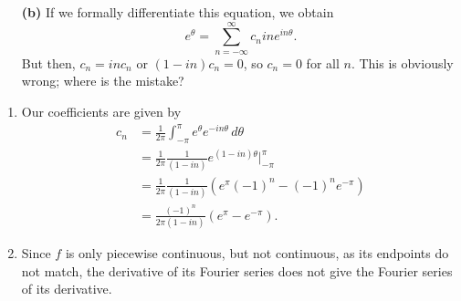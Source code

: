 \documentclass[10pt,letterpaper]{report}
\begin{document}
\begin{enumerate}
\begin{qbox}
\begin{itemize}
    \item[\textbf{(b)}] If we formally differentiate this equation, we obtain
    \[
    \displaystyle{e^\theta = \sum_{n = -\infty}^\infty c_nine^{in\theta}}.
    \]
    But then, $c_n = inc_n$ or $(1-in)c_n = 0$, so $c_n = 0$ for all $n$. This is obviously wrong; where is the mistake?
\end{itemize}
\end{qbox}

\begin{enumerate}
    \item Our coefficients are given by
    \begin{align*}
        c_n &= \frac{1}{2\pi} \int_{-\pi}^\pi e^\theta e^{-in\theta}\,d\theta
        \\
        &= \frac{1}{2\pi} \frac{1}{(1 - in)} e^{(1-in)\theta}\bigg\vert_{-\pi}^\pi
        \\
        &= \frac{1}{2\pi} \frac{1}{(1 - in)} \left(e^\pi(-1)^n - (-1)^ne^{-\pi}\right)
        \\
        &= \frac{(-1)^n}{2\pi(1 - in)} \left(e^\pi - e^{-\pi}\right).
    \end{align*}
    
    \item Since $f$ is only piecewise continuous, but not continuous, as its endpoints do not match, the derivative of its Fourier series does not give the Fourier series of its derivative.
\end{enumerate}


\end{enumerate}
\end{document}
